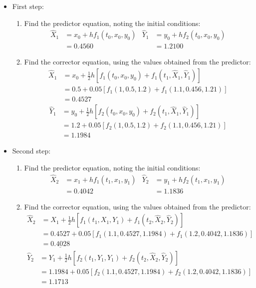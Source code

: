 \documentclass[10pt,a4paper]{article}
\begin{document}
\begin{itemize}
    \item First step:
    \begin{enumerate}
        \item Find the predictor equation, noting the initial conditions:
        \begin{align*}
            \hat{X}_1&=x_0+hf_1(t_0,x_0,y_0) & \hat{Y}_1&=y_0+hf_2(t_0,x_0,y_0) \\
            &= 0.4560 & &= 1.2100
        \end{align*}
        \item Find the corrector equation, using the values obtained from the predictor:
        \begin{align*}
            \hat{X}_1&=x_0+\frac{1}{2}h[f_1(t_0,x_0,y_0)+f_1(t_1,\hat{X}_1,\hat{Y}_1)] \\
            &= 0.5 + 0.05[f_1(1,0.5,1.2)+f_1(1.1,0.456,1.21)] \\
            &= 0.4527
        \end{align*}
        \begin{align*}
            \hat{Y}_1&=y_0+\frac{1}{2}h[f_2(t_0,x_0,y_0)+f_2(t_1,\hat{X}_1,\hat{Y}_1)] \\
            &= 1.2+0.05[f_2(1,0.5,1.2)+f_2(1.1,0.456,1.21)] \\
            &= 1.1984
        \end{align*}
    \end{enumerate} 
    \item Second step:
    \begin{enumerate}
        \item Find the predictor equation, noting the initial conditions:
        \begin{align*}
            \hat{X}_2&=x_1+hf_1(t_1,x_1,y_1) & \hat{Y}_2&=y_1+hf_2(t_1,x_1,y_1) \\
            &= 0.4042 & &= 1.1836
        \end{align*}
        \item Find the corrector equation, using the values obtained from the predictor:
        \begin{align*}
            \hat{X}_2&=X_1+\frac{1}{2}h[f_1(t_1,X_1,Y_1)+f_1(t_2,\hat{X}_2,\hat{Y}_2)] \\
            &= 0.4527 + 0.05[f_1(1.1,0.4527,1.1984)+f_1(1.2,0.4042,1.1836)] \\
            &= \underline{0.4028}
        \end{align*}
        \begin{align*}
            \hat{Y}_2&=Y_1+\frac{1}{2}h[f_2(t_1,Y_1,Y_1)+f_2(t_2,\hat{X}_2,\hat{Y}_2)] \\
            &= 1.1984+0.05[f_2(1.1,0.4527,1.1984)+f_2(1.2,0.4042,1.1836)] \\
            &= 1.1713
        \end{align*}
    \end{enumerate} 
\end{itemize}
\end{document}
